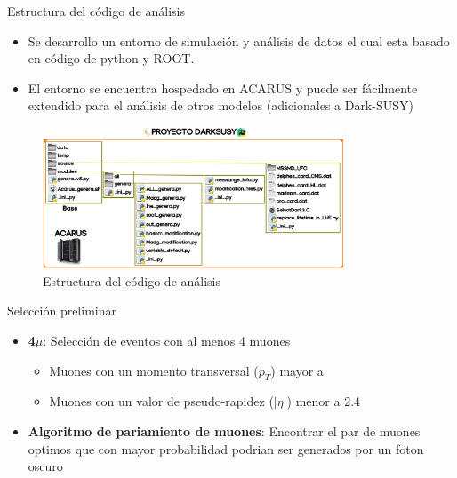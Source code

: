 \begin{frame}{Estructura del código de análisis}

\begin{itemize}
    \item Se desarrollo un entorno de simulaci\'on y an\'alisis de datos el cual esta basado en código de python y ROOT. 
    \item El entorno se encuentra hospedado en ACARUS y puede ser fácilmente extendido para el análisis de otros modelos (adicionales a Dark-SUSY)
\end{itemize}
    
\begin{figure}[h]
\centering
\includegraphics[width=0.8\textwidth]{Imag/proyecto_darksusy.png}
\caption{Estructura del código de análisis}
\end{figure}

\end{frame}



\begin{frame}{Selección preliminar}

\begin{itemize}
    \item \textbf{4$\mu$}: Selecci\'on de eventos con al menos 4 muones
    \begin{itemize}
        \item Muones con un momento transversal ($p_{T}$) mayor a
        \item Muones con un valor de pseudo-rapidez ($|\eta|$) menor a 2.4
    \end{itemize}
    \item \textbf{Algoritmo de pariamiento de muones}: Encontrar el par de muones optimos que con mayor probabilidad podrian ser generados por un foton oscuro
\end{itemize}
    
\end{frame}


